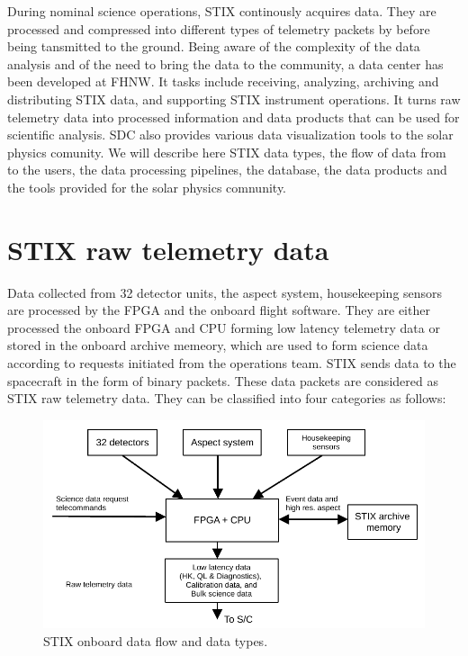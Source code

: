 \documentclass{aa}
\begin{document}
During nominal science operations, STIX continously acquires data. They are processed and compressed into different types of telemetry packets by
before being tansmitted to the ground.
Being aware of the complexity of the data analysis and of
the need to bring the data to the community, a data center has been
developed at FHNW.
It tasks include receiving, analyzing, archiving and distributing STIX data, and supporting STIX instrument operations.
It turns raw telemetry data into processed information and data products that can be used for scientific analysis.
SDC also provides various data visualization tools to the solar physics comunity.
We will describe here STIX data types,  the flow of data from to the users, the data processing pipelines, the database, the data products and the tools provided for the solar physics comnunity.

\section{STIX raw telemetry data}
Data collected from 32 detector units, the aspect system,
housekeeping sensors are processed by the FPGA and the onboard flight software.
They are either processed the onboard FPGA and CPU forming low latency telemetry data or stored in the onboard archive memeory,
which are used to form science data according to requests initiated from the operations team.
STIX sends data to the spacecraft in the form of binary packets.
These data packets are considered as STIX raw telemetry data.
They can be classified into four categories as follows:
\begin{figure}
    \centering
    \includegraphics[width=0.8\linewidth]{figures/onboardDataFlow.pdf}
    \caption{STIX onboard data flow and data types.}
    \label{fig:stix_onbard_data_flow}
\end{figure}
\end{document}
